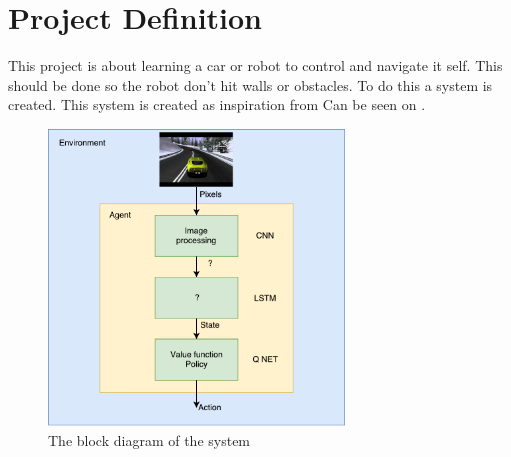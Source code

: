 \chapter{Project Definition}
\label{chap:projectdef}
This project is about learning a car or robot to control and navigate it self. This should be done so the robot don't hit walls or obstacles. To do this a system is created. This system is created as inspiration from  \cite{DBLP:journals/corr/MnihBMGLHSK16}
\newline
Can be seen on .

\begin{figure}[H]
	\centering
	\includegraphics[width=0.7\textwidth]{Figures/Project_definition_block_diagram}
	\caption{The block diagram of the system}
	\label{fig:Project_Definition}
\end{figure}

